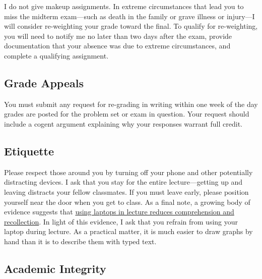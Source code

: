 \documentclass[11pt]{article}
\begin{document}
I do not give makeup assignments. In extreme circumstances that lead you to miss the midterm exam---such as death in the family or grave illness or injury---I will consider re-weighting your grade toward the final. To qualify for re-weighting, you will need to notify me no later than two days after the exam, provide documentation that your absence was due to extreme circumstances, and complete a qualifying assignment.

\subsection*{Grade Appeals} 

You must submit any request for re-grading in writing within one week of the day grades are posted for the problem set or exam in question. Your request should include a cogent argument explaining why your responses warrant full credit.



\subsection*{Etiquette} 

Please respect those around you by turning off your phone and other potentially distracting devices. I ask that you stay for the entire lecture---getting up and leaving distracts your fellow classmates. If you must leave early, please position yourself near the door when you get to class. As a final note, a growing body of evidence suggests that \href{https://www.theverge.com/2017/11/27/16703904/laptop-learning-lecture}{using laptops in lecture reduces comprehension and recollection}. In light of this evidence, I ask that you refrain from using your laptop during lecture. As a practical matter, it is much easier to draw graphs by hand than it is to describe them with typed text. 

\subsection*{Academic Integrity} 
\end{document}

